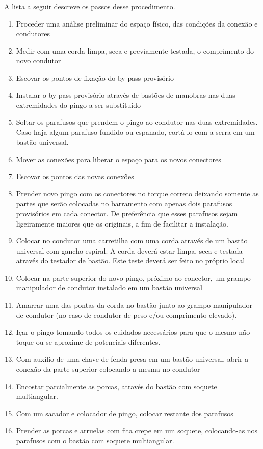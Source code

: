 A lista a seguir descreve os passos desse procedimento.
\begin{enumerate}
	\item Proceder uma análise preliminar do espaço físico, das condições da conexão e condutores
	\item  Medir com uma corda limpa, seca e previamente testada, o comprimento do novo condutor
	\item Escovar os pontos de fixação do by-pass provisório
	\item Instalar o by-pass provisório através de bastões de manobras nas duas extremidades do pingo a ser substituído
	\item Soltar os parafusos que prendem o pingo ao condutor nas duas extremidades. Caso haja algum parafuso fundido ou espanado, cortá-lo com a serra em um bastão universal.
	\item Mover as conexões para liberar o espaço para os novos conectores
	\item Escovar os pontos das novas conexões
	\item Prender novo pingo com os conectores no torque correto deixando somente as partes que serão colocadas no barramento com apenas dois parafusos provisórios em cada conector. De preferência que esses parafusos sejam ligeiramente maiores que os originais, a fim de facilitar a instalação.
	\item Colocar no condutor uma carretilha com uma corda através de um bastão universal com gancho espiral. A corda deverá estar limpa, seca e testada através do testador de bastão. Este teste deverá ser feito no próprio local
	\item Colocar na parte superior do novo pingo, próximo ao conector, um grampo manipulador de condutor instalado em um bastão universal
	\item Amarrar uma das pontas da corda no bastão junto ao grampo manipulador de condutor (no caso de condutor de peso e/ou comprimento elevado).
	\item Içar o pingo tomando todos os cuidados necessários para que o mesmo não toque ou se aproxime de potenciais diferentes. 
	\item Com auxílio de uma chave de fenda presa em um bastão universal, abrir a conexão da parte superior colocando a mesma no condutor
	\item Encostar parcialmente as porcas, através do bastão com soquete multiangular.
	\item Com um sacador e colocador de pingo, colocar restante dos parafusos
	\item Prender as porcas e arruelas com fita crepe em um soquete, colocando-as nos parafusos com o bastão com soquete multiangular.

\end{enumerate}
